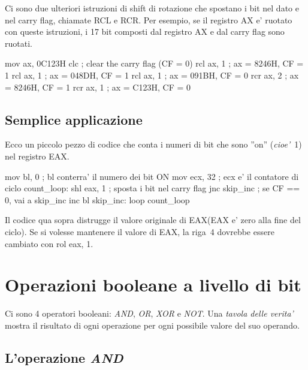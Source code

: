 Ci sono due ulteriori istruzioni di shift di rotazione che spostano i bit
nel dato e nel carry flag, chiamate {\code RCL}  e {\code
RCR}.  Per esempio, se il registro {\code AX} e' ruotato 
con queste istruzioni, i 17 bit composti dal registro AX e dal carry flag
sono ruotati.
\begin{AsmCodeListing}[frame=none]
      mov    ax, 0C123H
      clc                    ; clear the carry flag (CF = 0)
      rcl    ax, 1           ; ax = 8246H, CF = 1
      rcl    ax, 1           ; ax = 048DH, CF = 1
      rcl    ax, 1           ; ax = 091BH, CF = 0
      rcr    ax, 2           ; ax = 8246H, CF = 1
      rcr    ax, 1           ; ax = C123H, CF = 0
\end{AsmCodeListing}

\subsection{Semplice applicazione\label{sect:AddBitsExample}}

Ecco un piccolo pezzo di codice che conta i numeri di bit che sono ''on''
(\emph{cioe'}~1) nel registro EAX.
\begin{AsmCodeListing}
      mov    bl, 0           ; bl conterra' il numero dei bit ON
      mov    ecx, 32         ; ecx e' il contatore di ciclo
count_loop:
      shl    eax, 1          ; sposta i bit nel carry flag
      jnc    skip_inc        ; se CF == 0, vai a skip_inc
      inc    bl
skip_inc:
      loop   count_loop
\end{AsmCodeListing}
Il codice qua sopra distrugge il valore originale di {\code EAX}({\code EAX} e' zero
alla fine del ciclo). Se si volesse mantenere il valore di {\code EAX}, 
la riga~4 dovrebbe essere cambiato con {\code rol  eax, 1}. 

\section{Operazioni booleane a livello di bit}

Ci sono 4 operatori booleani: \emph{AND}, \emph{OR}, \emph{XOR} e
\emph{NOT}. Una \emph{tavola delle verita'} mostra il risultato di ogni operazione
per ogni possibile valore del suo operando.

\subsection{L'operazione \emph{AND}}

